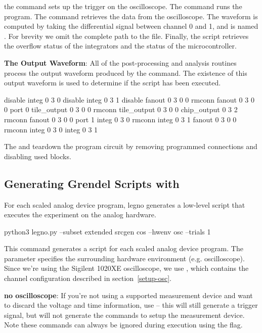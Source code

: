 \noindent the  command sets up the trigger on the
oscilloscope. The  command runs the program. The
 command retrieves the data from the oscilloscope. The
waveform is computed by taking the differential signal between channel 0 and 1,
and is named . For brevity we omit the complete path to the
 file. Finally, the script retrieves the overflow status of the
integrators and the status of the microcontroller.

\noindent\textbf{The Output Waveform}: All of the post-processing and analysis
routines process the output waveform produced by the 
command. The existence of this output waveform is used to determine if the
script has been executed. 

\begin{snippet}
disable integ 0 3 0
disable integ 0 3 1
disable fanout 0 3 0 0
rmconn fanout 0 3 0 0 port 0 tile_output 0 3 0 0
rmconn tile_output 0 3 0 0 chip_output 0 3 2
rmconn fanout 0 3 0 0 port 1 integ 0 3 0
rmconn integ 0 3 1 fanout 0 3 0 0
rmconn integ 0 3 0 integ 0 3 1
\end{snippet}

\noindent The  and  teardown the program circuit by
removing programmed connections and disabling used blocks.

\subsection{Generating Grendel Scripts with }

For each scaled analog device program, legno generates a low-level \grendel
script that executes the experiment on the analog hardware. 

\begin{snippet}
  python3 legno.py --subset extended srcgen cos --hwenv osc --trials 1
\end{snippet}

This command generates a \grendel script for each scaled analog device program.
The  parameter specifies the surrounding hardware environment
(e.g. oscilloscope). Since we're using the Sigilent 1020XE oscilloscope, we use
, which contains the channel configuration described in section~\ref{setup-osc}.

\noindent\textbf{no oscilloscope}: If you're not using a supported measurement
device and want to discard the voltage and time information, use
 -- this will still generate a trigger signal, but will not
generate the commands to setup the measurement device. Note these commands can
always be ignored during execution using the  flag. 

